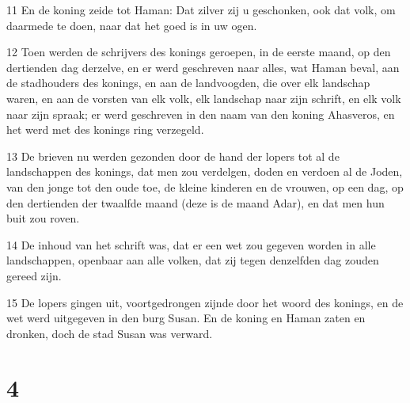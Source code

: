 \par 11 En de koning zeide tot Haman: Dat zilver zij u geschonken, ook dat volk, om daarmede te doen, naar dat het goed is in uw ogen.
\par 12 Toen werden de schrijvers des konings geroepen, in de eerste maand, op den dertienden dag derzelve, en er werd geschreven naar alles, wat Haman beval, aan de stadhouders des konings, en aan de landvoogden, die over elk landschap waren, en aan de vorsten van elk volk, elk landschap naar zijn schrift, en elk volk naar zijn spraak; er werd geschreven in den naam van den koning Ahasveros, en het werd met des konings ring verzegeld.
\par 13 De brieven nu werden gezonden door de hand der lopers tot al de landschappen des konings, dat men zou verdelgen, doden en verdoen al de Joden, van den jonge tot den oude toe, de kleine kinderen en de vrouwen, op een dag, op den dertienden der twaalfde maand (deze is de maand Adar), en dat men hun buit zou roven.
\par 14 De inhoud van het schrift was, dat er een wet zou gegeven worden in alle landschappen, openbaar aan alle volken, dat zij tegen denzelfden dag zouden gereed zijn.
\par 15 De lopers gingen uit, voortgedrongen zijnde door het woord des konings, en de wet werd uitgegeven in den burg Susan. En de koning en Haman zaten en dronken, doch de stad Susan was verward.

\chapter{4}

